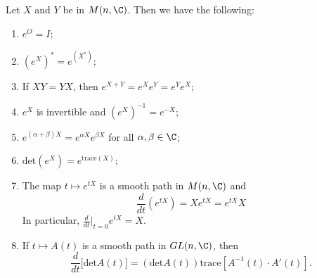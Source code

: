 \begin{prop}[Properties]
   Let \( X  \) and \( Y  \) be in \( M(n,\C) \). Then we have the following: 
   \begin{enumerate}
       \item[(1)] \( e^{O} = I  \);
       \item[(2)] \( (e^{X})^{*} = e^{(X^{*})} \);
       \item[(3)] If \( XY = YX \), then \( e^{X+Y} = e^{X} e^{Y} = e^{Y} e^{X} \);
        \item[(4)] \( e^{X} \) is invertible and \( (e^{X})^{-1} = e^{-X} \);
        \item[(5)] \( e^{(\alpha + \beta)X} = e^{\alpha X} e^{\beta X} \) for all \( \alpha, \beta \in \C \);
        \item[(6)] \( \text{det}(e^{X}) = e^{\text{trace}(X)} \);
        \item[(7)] The map \( t \mapsto e^{tX}  \) is a smooth path in \( M(n,\C) \) and
            \[ \frac{ d }{ dt  }  (e^{tX}) = X e^{tX} = e^{tX} X  \]
            In particular, \( \displaystyle \frac{ d }{ dt  } \Big|_{t=0}  e^{tX} = X  \).
        \item[(8)] If \( t \mapsto A(t)  \) is a smooth path in \( GL(n,\C) \), then 
            \[  \frac{ d }{ dt } \Big[\text{det}A(t)\Big] = (\text{det}A(t)) \text{trace}[A^{-1}(t) \cdot A'(t)]. \]
   \end{enumerate}
\end{prop}
